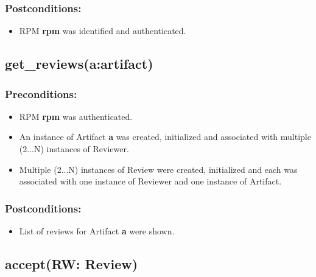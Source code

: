 \subsubsection*{Postconditions:}
\begin{itemize}
\itemsep-1.5em 
   \item RPM \textbf{rpm} was identified and authenticated.

\end{itemize}





\subsection*{get\_reviews(a:artifact)}

\subsubsection*{Preconditions:}
\begin{itemize}
\itemsep-1.5em 
    \item RPM \textbf{rpm} was authenticated.
    \item An instance of Artifact \textbf{a} was created, initialized and associated with multiple (2...N) instances of Reviewer.
    \item Multiple (2...N) instances of Review were created, initialized and each was associated with one instance of Reviewer and one instance of Artifact.
    
  
   
\end{itemize}



\subsubsection*{Postconditions:}
\begin{itemize}
\itemsep-1.5em 
   \item List of reviews for Artifact \textbf{a} were shown.

\end{itemize}








\subsection*{accept(RW: Review)}


